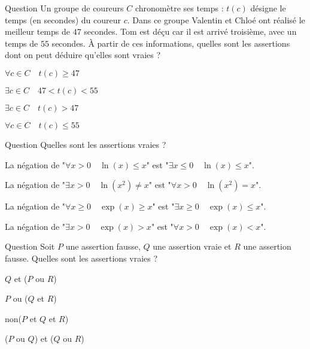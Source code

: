 \begin{multi}[multiple,feedback=
{Comme Tom est troisième, il n'existe pas de \(c\) tel que \(47 < t(c) < 55\). 
}]{Question}
Un groupe de coureurs \(C\) chronomètre ses temps : \(t(c)\) désigne le temps (en secondes) du coureur \(c\).
Dans ce groupe Valentin et Chloé ont réalisé le meilleur temps de \(47\) secondes. Tom est dé\c{c}u car il est arrivé troisième, avec un temps de \(55\) secondes.
À partir de ces informations, quelles sont les assertions dont on peut déduire qu'elles sont vraies ?

    \item* \(\forall c \in C \quad t(c) \ge 47\)
    \item \(\exists c \in C \quad 47 < t(c) < 55\)
    \item* \(\exists c \in C \quad t(c) > 47\)
    \item \(\forall c \in C \quad t(c) \le 55\)
\end{multi}


\begin{multi}[multiple,feedback=
{La négation de "\(\forall x > 0 \quad P(x)\)" est "\(\exists x > 0 \quad\) non(\(P(x)\))".
La négation de "\(\exists x > 0 \quad P(x)\)" est "\(\forall x > 0 \quad\) non(\(P(x)\))".
}]{Question}
Quelles sont les assertions vraies ?

    \item La négation de "\(\forall x > 0 \quad \ln(x) \le x\)" est "\(\exists x \le 0 \quad  \ln(x) \le x\)".
    \item* La négation de "\(\exists x > 0 \quad \ln(x^2) \neq x\)" est "\(\forall x > 0 \quad \ln(x^2) = x\)".
    \item La négation de "\(\forall x \ge 0 \quad \exp(x) \ge x\)" est "\(\exists x \ge 0 \quad  \exp(x) \le x\)".
    \item La négation de "\(\exists x > 0 \quad \exp(x) >  x\)" est "\(\forall x > 0 \quad \exp(x) < x\)".
\end{multi}


\begin{multi}[multiple,feedback=
{Il suffit de remplacer \(P\) par "faux", \(Q\) par "vrai" et \(R\) par "faux". Par exemple "\(Q\) et (\(P\) ou \(R\))" devient "vrai et (faux ou faux)", qui est la même chose que "vrai et faux", qui est donc "faux".
}]{Question}
Soit \(P\) une assertion fausse, \(Q\) une assertion vraie et \(R\) une assertion fausse. Quelles sont les assertions vraies ?

    \item \(Q\) et (\(P\) ou \(R\))
    \item \(P\) ou (\(Q\) et \(R\))
    \item* non(\(P\) et \(Q\) et \(R\))
    \item* (\(P\) ou \(Q\)) et (\(Q\) ou \(R\))
\end{multi}


